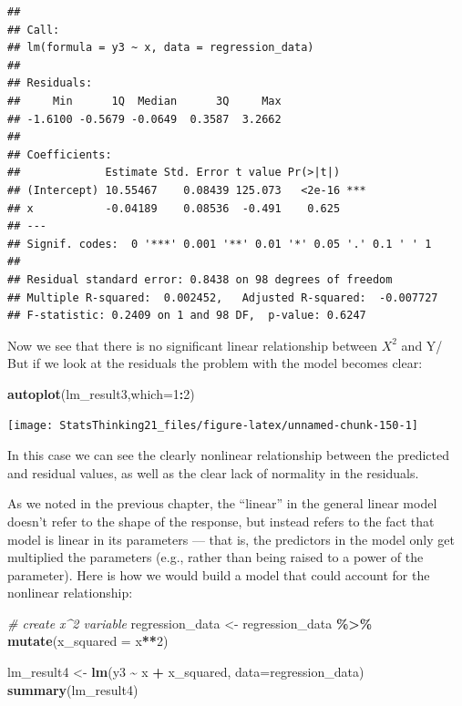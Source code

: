 \documentclass[
  12pt,
]{book}
\newenvironment{Shaded}{\begin{snugshade}}{\end{snugshade}}
\newcommand{\AttributeTok}[1]{\textcolor[rgb]{0.13,0.29,0.53}{#1}}
\newcommand{\CommentTok}[1]{\textcolor[rgb]{0.56,0.35,0.01}{\textit{#1}}}
\newcommand{\DecValTok}[1]{\textcolor[rgb]{0.00,0.00,0.81}{#1}}
\newcommand{\FunctionTok}[1]{\textcolor[rgb]{0.13,0.29,0.53}{\textbf{#1}}}
\newcommand{\NormalTok}[1]{#1}
\newcommand{\OtherTok}[1]{\textcolor[rgb]{0.56,0.35,0.01}{#1}}
\newcommand{\SpecialCharTok}[1]{\textcolor[rgb]{0.81,0.36,0.00}{\textbf{#1}}}
\begin{document}
\begin{verbatim}
## 
## Call:
## lm(formula = y3 ~ x, data = regression_data)
## 
## Residuals:
##     Min      1Q  Median      3Q     Max 
## -1.6100 -0.5679 -0.0649  0.3587  3.2662 
## 
## Coefficients:
##             Estimate Std. Error t value Pr(>|t|)    
## (Intercept) 10.55467    0.08439 125.073   <2e-16 ***
## x           -0.04189    0.08536  -0.491    0.625    
## ---
## Signif. codes:  0 '***' 0.001 '**' 0.01 '*' 0.05 '.' 0.1 ' ' 1
## 
## Residual standard error: 0.8438 on 98 degrees of freedom
## Multiple R-squared:  0.002452,   Adjusted R-squared:  -0.007727 
## F-statistic: 0.2409 on 1 and 98 DF,  p-value: 0.6247
\end{verbatim}

Now we see that there is no significant linear relationship between \(X^2\) and Y/ But if we look at the residuals the problem with the model becomes clear:

\begin{Shaded}
\begin{Highlighting}[]
\FunctionTok{autoplot}\NormalTok{(lm\_result3,}\AttributeTok{which=}\DecValTok{1}\SpecialCharTok{:}\DecValTok{2}\NormalTok{)}
\end{Highlighting}
\end{Shaded}

\texttt{[image: StatsThinking21\_files/figure-latex/unnamed-chunk-150-1]}

In this case we can see the clearly nonlinear relationship between the predicted and residual values, as well as the clear lack of normality in the residuals.

As we noted in the previous chapter, the ``linear'' in the general linear model doesn't refer to the shape of the response, but instead refers to the fact that model is linear in its parameters --- that is, the predictors in the model only get multiplied the parameters (e.g., rather than being raised to a power of the parameter). Here is how we would build a model that could account for the nonlinear relationship:

\begin{Shaded}
\begin{Highlighting}[]
\CommentTok{\# create x\^{}2 variable}
\NormalTok{regression\_data }\OtherTok{\textless{}{-}}\NormalTok{ regression\_data }\SpecialCharTok{\%\textgreater{}\%}
  \FunctionTok{mutate}\NormalTok{(}\AttributeTok{x\_squared =}\NormalTok{ x}\SpecialCharTok{**}\DecValTok{2}\NormalTok{)}

\NormalTok{lm\_result4 }\OtherTok{\textless{}{-}} \FunctionTok{lm}\NormalTok{(y3 }\SpecialCharTok{\textasciitilde{}}\NormalTok{ x }\SpecialCharTok{+}\NormalTok{ x\_squared, }\AttributeTok{data=}\NormalTok{regression\_data)}
\FunctionTok{summary}\NormalTok{(lm\_result4)}
\end{Highlighting}
\end{Shaded}
\end{document}
